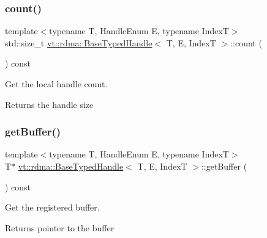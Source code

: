 \subsubsection{\texorpdfstring{count()}{count()}}
{\footnotesize\ttfamily template$<$typename T, Handle\+Enum E, typename IndexT$>$ \\
std\+::size\+\_\+t \hyperlink{structvt_1_1rdma_1_1_base_typed_handle}{vt\+::rdma\+::\+Base\+Typed\+Handle}$<$ T, E, IndexT $>$\+::count (\begin{DoxyParamCaption}{ }\end{DoxyParamCaption}) const\hspace{0.3cm}{\ttfamily [inline]}}



Get the local handle count. 

\begin{DoxyReturn}{Returns}
the handle size 
\end{DoxyReturn}
\mbox{\label{structvt_1_1rdma_1_1_base_typed_handle_a6774922e581a9b8c19eccf749077f577}} 
\subsubsection{\texorpdfstring{get\+Buffer()}{getBuffer()}}
{\footnotesize\ttfamily template$<$typename T, Handle\+Enum E, typename IndexT$>$ \\
T$\ast$ \hyperlink{structvt_1_1rdma_1_1_base_typed_handle}{vt\+::rdma\+::\+Base\+Typed\+Handle}$<$ T, E, IndexT $>$\+::get\+Buffer (\begin{DoxyParamCaption}{ }\end{DoxyParamCaption}) const\hspace{0.3cm}{\ttfamily [inline]}}



Get the registered buffer. 

\begin{DoxyReturn}{Returns}
pointer to the buffer 
\end{DoxyReturn}
\mbox{\label{structvt_1_1rdma_1_1_base_typed_handle_a465a9836d31034a5f96b5826ae3ba064}} 
